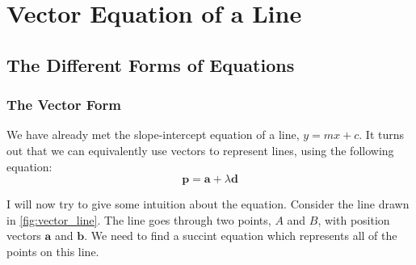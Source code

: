 \documentclass[
	11pt, %
	fleqn, %
	a4paper, %
]{../../styles/LegrandOrangeBook}
\begin{document}
%	
%



\chapter{Vector Equation of a Line}

\section{The Different Forms of Equations}

\subsection{The Vector Form}

We have already met the slope-intercept equation of a line, $y = mx + c$. It turns out that we can equivalently use vectors to represent lines, using the following equation:
\begin{equation}
    \mathbf{p} = \mathbf{a} + \lambda \mathbf{d}
\end{equation}

I will now try to give some intuition about the equation. Consider the line drawn in \autoref{fig:vector_line}. The line goes through two points, $A$ and $B$, with position vectors $\mathbf{a}$ and $\mathbf{b}$. We need to find a succint equation which represents all of the points on this line.
\end{document}
